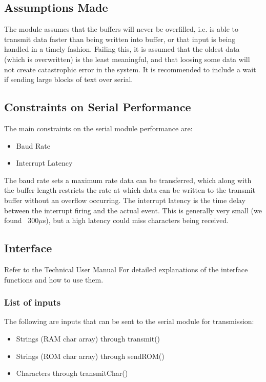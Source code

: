 \documentclass[]{report}
\begin{document}
\subsection{Assumptions Made}
The module assumes that the buffers will never be overfilled, i.e. is able to transmit data faster than being written into buffer, or that input is being handled in a timely fashion. Failing this, it is assumed that the oldest data (which is overwritten) is the least meaningful, and that loosing some data will not create catastrophic error in the system. It is recommended to include a wait if sending large blocks of text over serial.

\subsection{Constraints on Serial Performance}
The main constraints on the serial module performance are:
\begin{itemize}
	\item Baud Rate
	\item Interrupt Latency
\end{itemize}
The baud rate sets a maximum rate data can be transferred, which along with the buffer length restricts the rate at which data can be written to the transmit buffer without an overflow occurring.
The interrupt latency is the time delay between the interrupt firing and the actual event. This is generally very small (we found ~300$\mu$s), but a high latency could miss characters being received.

\subsection{Interface}
Refer to the Technical User Manual For detailed explanations of the interface functions and how to use them.

\subsubsection{List of inputs}
The following are inputs that can be sent to the serial module for transmission:
\begin{itemize}
	\item Strings (RAM char array) through transmit()
	\item Strings (ROM char array) through sendROM()
	\item Characters through transmitChar()
\end{itemize}
\end{document}
